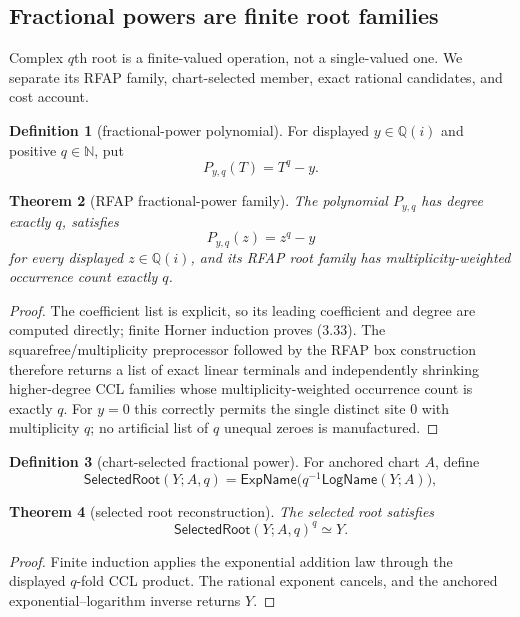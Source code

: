 \documentclass[10pt]{article}
\newtheorem{theorem}{Theorem}[section]
\theoremstyle{definition}
\newtheorem{definition}[theorem]{Definition}
\theoremstyle{remark}
\newcommand{\N}{\mathbb{N}}
\newcommand{\Qi}{\mathbb{Q}(i)}
\begin{document}
\subsection{Fractional powers are finite root families}

Complex $q$th root is a finite-valued operation, not a single-valued one.  We
separate its RFAP family, chart-selected member, exact rational candidates,
and cost account.

\begin{definition}[fractional-power polynomial]
For displayed $y\in\Qi$ and positive $q\in\N$, put
\[
 P_{y,q}(T)=T^q-y.
 \tag{3.32}
\]
\end{definition}

\begin{theorem}[RFAP fractional-power family]
The polynomial $P_{y,q}$ has degree exactly $q$, satisfies
\[
 P_{y,q}(z)=z^q-y
 \tag{3.33}
\]
for every displayed $z\in\Qi$, and its RFAP root family has
multiplicity-weighted occurrence count exactly $q$.
\end{theorem}

\begin{proof}
The coefficient list is explicit, so its leading coefficient and degree are
computed directly; finite Horner induction proves (3.33).  The
squarefree/multiplicity
preprocessor followed by the RFAP box construction therefore returns a list
of exact linear terminals and independently shrinking higher-degree CCL
families whose multiplicity-weighted occurrence count is exactly $q$.
For $y=0$ this correctly permits the single distinct site $0$ with
multiplicity $q$; no artificial list of $q$ unequal zeroes is manufactured.
\end{proof}

\begin{definition}[chart-selected fractional power]
For anchored chart $A$, define
\[
 \mathsf{SelectedRoot}(Y;A,q)
   =\mathsf{ExpName}\bigl(q^{-1}\mathsf{LogName}(Y;A)\bigr),
 \tag{3.34}
\]
\end{definition}

\begin{theorem}[selected root reconstruction]
The selected root satisfies
\[
 \mathsf{SelectedRoot}(Y;A,q)^q\simeq Y.
 \tag{3.35}
\]
\end{theorem}

\begin{proof}
Finite induction applies the exponential addition law through the displayed
$q$-fold CCL product.  The rational exponent cancels, and the anchored
exponential--logarithm inverse returns $Y$.
\end{proof}
\end{document}

